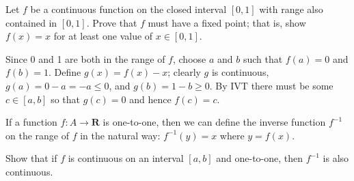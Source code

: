\begin{exercise}
  Let $f$ be a continuous function on the closed interval $[0,1]$ with range also contained in $[0,1]$. Prove that $f$ must have a fixed point; that is, show $f(x)=x$ for at least one value of $x \in[0,1]$.
\end{exercise}
\begin{solution}
    Since 0 and 1 are both in the range of \(f\), choose \(a\) and \(b\) such that \(f(a) = 0\) and \(f(b) = 1\). Define \(g(x) = f(x) - x\); clearly \(g\) is continuous, \(g(a) = 0 - a = -a \leq 0\), and \(g(b) = 1 - b \geq 0\). By IVT there must be some \(c \in [a, b]\) so that \(g(c) = 0\) and hence \(f(c) = c\).
\end{solution}

\begin{exercise}
  If a function $f: A \rightarrow \mathbf{R}$ is one-to-one, then we can define the inverse function $f^{-1}$ on the range of $f$ in the natural way: $f^{-1}(y)=x$ where $y=f(x)$.

  Show that if $f$ is continuous on an interval $[a, b]$ and one-to-one, then $f^{-1}$ is also continuous.
\end{exercise}
\begin{solution}
  \TODO
\end{solution}
